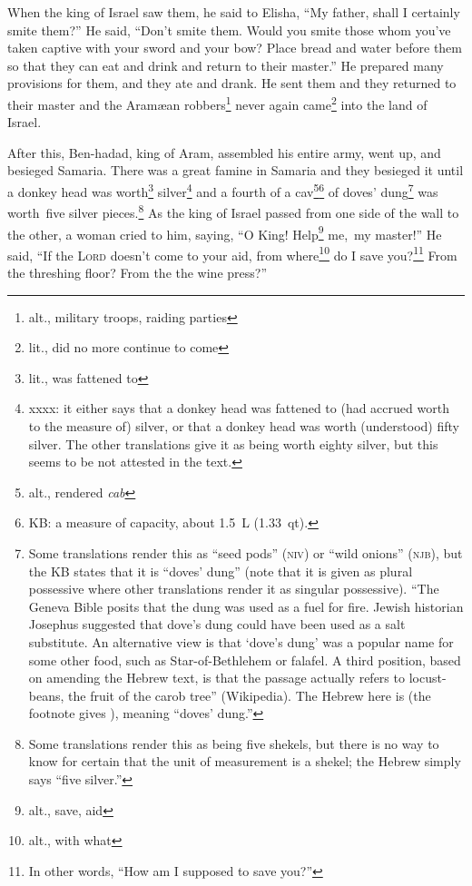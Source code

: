 \begin{inparaenum}
     When the king of Israel saw them, he said to Elisha, ``My father, shall I certainly smite them?''%
     He said, ``Don't smite them. Would you smite those whom you've taken captive with your sword and your bow? Place bread and water before them so that they can eat and drink and return to their master.''%
     He prepared many provisions for them, and they ate and drank. He sent them and they returned to their master and the Aram\ae{}an robbers\footnote{alt., military troops, raiding parties} never again came\footnote{lit., did no more continue to come} into the land of Israel.%
    
     After this, Ben-hadad, king of Aram, assembled his entire army, went up, and besieged Samaria.%
     There was a great famine in Samaria and they besieged it until a donkey head was worth\footnote{lit., was fattened to} silver\footnote{xxxx: it either says that a donkey head was fattened to (had accrued worth to the measure of) silver, or that a donkey head was worth (understood) fifty silver. The other translations give it as being worth eighty silver, but this seems to be not attested in the text.} and a fourth of a cav\footnote{alt., rendered \textit{cab}}\footnote{KB: a measure of capacity, about 1.5~L (1.33~qt).} of doves' dung\footnote{Some translations render this as ``seed pods'' (\textsc{niv}) or ``wild onions'' (\textsc{njb}), but the KB states that it is ``doves' dung'' (note that it is given as plural possessive where other translations render it as singular possessive). ``The Geneva Bible posits that the dung was used as a fuel for fire. Jewish historian Josephus suggested that dove's dung could have been used as a salt substitute. An alternative view is that `dove's dung' was a popular name for some other food, such as Star-of-Bethlehem or falafel. A third position, based on amending the Hebrew text, is that the passage actually refers to locust-beans, the fruit of the carob tree'' (Wikipedia). The Hebrew here is  (the footnote gives ), meaning ``doves' dung.''} was worth\understood\ five silver pieces.\footnote{Some translations render this as being five shekels, but there is no way to know for certain that the unit of measurement is a shekel; the Hebrew simply says ``five silver.''}%
     As the king of Israel passed from one side of the wall to the other, a woman cried to him, saying, ``O King! Help\footnote{alt., save, aid} me,\understood\ my master!''%
     He said, ``If the \textsc{Lord} doesn't come to your aid, from where\footnote{alt., with what} do I save you?\footnote{In other words, ``How am I supposed to save you?''} From the threshing floor? From the the wine press?''%

\end{inparaenum}
